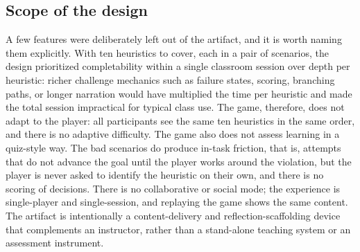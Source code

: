 \subsection{Scope of the design}

A few features were deliberately left out of the artifact, and it is worth naming them explicitly. With ten heuristics to cover, each in a pair of scenarios, the design prioritized completability within a single classroom session over depth per heuristic: richer challenge mechanics such as failure states, scoring, branching paths, or longer narration would have multiplied the time per heuristic and made the total session impractical for typical class use. The game, therefore, does not adapt to the player: all participants see the same ten heuristics in the same order, and there is no adaptive difficulty. The game also does not assess learning in a quiz-style way. The bad scenarios do produce in-task friction, that is, attempts that do not advance the goal until the player works around the violation, but the player is never asked to identify the heuristic on their own, and there is no scoring of decisions. There is no collaborative or social mode; the experience is single-player and single-session, and replaying the game shows the same content. The artifact is intentionally a content-delivery and reflection-scaffolding device that complements an instructor, rather than a stand-alone teaching system or an assessment instrument.
